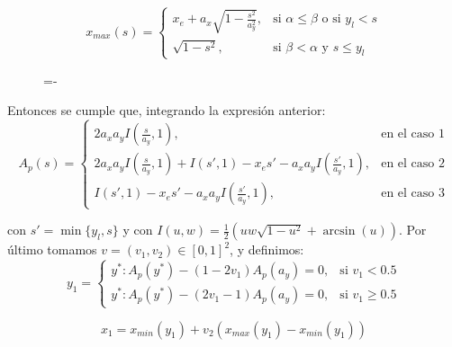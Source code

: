 \[ x_{max}(s) = 
   \begin{cases} 
       x_e+a_x\sqrt{1-\frac{s^2}{a_y^2}},  & \text{si $\alpha\leq\beta$ o si $y_l<s$} \\
       \sqrt{1-s^2}, & \text{si $\beta < \alpha$ y $s\leq y_l$}
   \end{cases}
\]

\begin{figure}[h]
  \lineskip=-\fboxrule
\end{figure}

Entonces se cumple que, integrando la expresión anterior:
\[ A_p(s) = 
   \begin{cases} 
       2a_xa_yI(\frac{s}{a_y},1),  & \text{en el caso 1} \\
       2a_xa_yI(\frac{s}{a_y},1) + I(s',1)-x_es' - a_xa_yI(\frac{s'}{a_y},1),  & \text{en el caso 2} \\
       I(s',1)- x_es' -a_xa_yI(\frac{s'}{a_y},1),  & \text{en el caso 3} 
   \end{cases}
\]

con $s'=\min\{y_l,s\}$ y con $I(u,w) = \frac{1}{2}(uw\sqrt{1-u^2} + \arcsin(u))$. Por último tomamos $v=(v_1,v_2)\in[0,1]^2$, y definimos:
\[ y_1 = 
   \begin{cases} 
      y^*: A_p(y^*)-(1-2v_1)A_p(a_y)=0,  & \text{si $v_1<0.5$} \\
      y^*:  A_p(y^*)-(2v_1-1)A_p(a_y)=0,  & \text{si $v_1\geq 0.5$}
   \end{cases}
\]

$$x_1 = x_{min}(y_1) + v_2 (x_{max}(y_1) - x_{min}(y_1))$$

